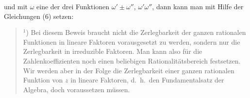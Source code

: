 und mit $\omega$ eine der drei Funktionen $\omega' \pm \omega''$, $\omega'\omega''$, dann
kann man mit Hilfe der Gleichungen (6) setzen:


\begin{quote}
$^1$) Bei diesem Beweis braucht nicht die Zerlegbarkeit der ganzen rationalen Funktionen in
lineare Faktoren vorausgesetzt zu werden, sondern nur die Zerlegbarkeit in irreduzible
Faktoren. Man kann also f\"ur die Zahlenkoeffizienten noch einen beliebigen
Rationalit\"atsbereich festsetzen. Wir werden aber in der Folge die Zerlegbarkeit einer
ganzen rationalen Funktion von $z$ in lineare Faktoren, d.\ h.\ den Fundamentalsatz der
Algebra, doch voraussetzen m\"ussen.
\end{quote}

